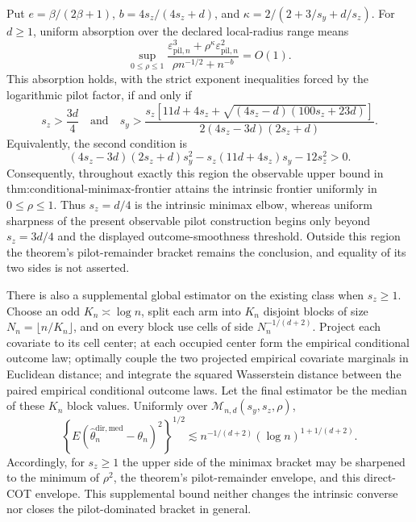 Put \(e=\beta/(2\beta+1)\), \(b=4s_z/(4s_z+d)\), and \(\kappa=2/(2+3/s_y+d/s_z)\).  For \(d\ge1\), uniform absorption over the declared local-radius range means
\[
\sup_{0\le\rho\le1}
\frac{\varepsilon_{\mathrm{pil},n}^3+\rho^\kappa\varepsilon_{\mathrm{pil},n}^2}
{\rho n^{-1/2}+n^{-b}}=O(1).
\]
This absorption holds, with the strict exponent inequalities forced by the logarithmic pilot factor, if and only if
\[
s_z>\frac{3d}{4}
\quad\text{and}\quad
s_y>
\frac{s_z\!\left[11d+4s_z+\sqrt{(4s_z-d)(100s_z+23d)}\right]}
{2(4s_z-3d)(2s_z+d)}.
\]
Equivalently, the second condition is
\[
(4s_z-3d)(2s_z+d)s_y^2-s_z(11d+4s_z)s_y-12s_z^2>0.
\]
Consequently, throughout exactly this region the observable upper bound in \(\text{thm:conditional-minimax-frontier}\) attains the intrinsic frontier uniformly in \(0\le\rho\le1\).  Thus \(s_z=d/4\) is the intrinsic minimax elbow, whereas uniform sharpness of the present observable pilot construction begins only beyond \(s_z=3d/4\) and the displayed outcome-smoothness threshold.  Outside this region the theorem's pilot-remainder bracket remains the conclusion, and equality of its two sides is not asserted.

There is also a supplemental global estimator on the existing class when \(s_z\ge1\).  Choose an odd \(K_n\asymp\log n\), split each arm into \(K_n\) disjoint blocks of size \(N_n=\lfloor n/K_n\rfloor\), and on every block use cells of side \(N_n^{-1/(d+2)}\).  Project each covariate to its cell center; at each occupied center form the empirical conditional outcome law; optimally couple the two projected empirical covariate marginals in Euclidean distance; and integrate the squared Wasserstein distance between the paired empirical conditional outcome laws.  Let the final estimator be the median of these \(K_n\) block values.  Uniformly over \(\mathcal M_{n,d}(s_y,s_z,\rho)\),
\[
\left\{E(\widehat\theta_n^{\mathrm{dir,med}}-\theta_n)^2\right\}^{1/2}
\lesssim n^{-1/(d+2)}(\log n)^{1+1/(d+2)}.
\]
Accordingly, for \(s_z\ge1\) the upper side of the minimax bracket may be sharpened to the minimum of \(\rho^2\), the theorem's pilot-remainder envelope, and this direct-COT envelope.  This supplemental bound neither changes the intrinsic converse nor closes the pilot-dominated bracket in general.